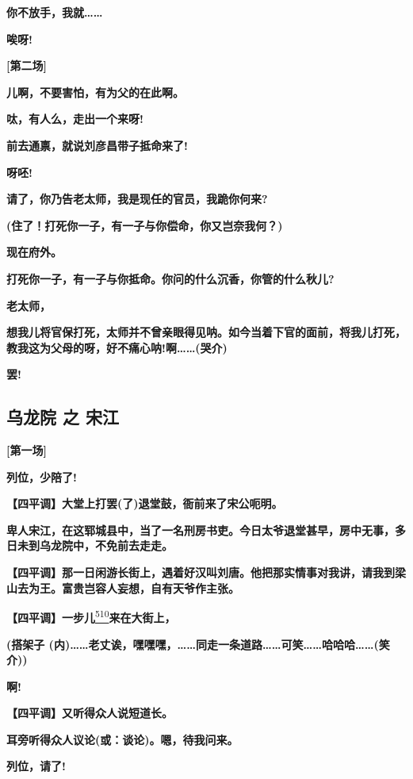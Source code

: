 \textbf{你不放手，我就\ldots{}\ldots{}}

\textbf{唉呀!}

\textbf{{[}第二场{]}}

\textbf{儿啊，不要害怕，有为父的在此啊。}

\textbf{呔，有人么，走出一个来呀!}

\textbf{前去通禀，就说刘彦昌带子抵命来了!}

\textbf{呀呸!}

\textbf{请了，你乃告老太师，我是现任的官员，我跪你何来?}

\textbf{(住了！打死你一子，有一子与你偿命，你又岂奈我何？)}

\textbf{现在府外。}

\textbf{打死你一子，有一子与你抵命。你问的什么沉香，你管的什么秋儿?}

\textbf{老太师，}

\textbf{想我儿将官保打死，太师并不曾亲眼得见呐。如今当着下官的面前，将我儿打死，教我这为父母的呀，好不痛心呐!啊\ldots{}\ldots{}(哭介)}

\textbf{罢!}

\newpage
\hypertarget{ux4e4cux9f99ux9662-ux4e4b-ux5b8bux6c5f}{%
\subsection{乌龙院 之
宋江}\label{ux4e4cux9f99ux9662-ux4e4b-ux5b8bux6c5f}}

\textbf{{[}第一场{]}}

\textbf{列位，少陪了!}

\textbf{【四平调】大堂上打罢(了)退堂鼓，衙前来了宋公呃明。}

\textbf{卑人宋江，在这郓城县中，当了一名刑房书吏。今日太爷退堂甚早，房中无事，多日未到乌龙院中，不免前去走走。}

\textbf{【四平调】那一日闲游长街上，遇着好汉叫刘唐。他把那实情事对我讲，请我到梁山去为王。富贵岂容人妄想，自有天爷作主张。}

\textbf{【四平调】一步儿}\protect\hyperlink{fn510}{\textsuperscript{510}}\textbf{来在大街上，}

\textbf{(搭架子
(内)\ldots{}\ldots{}老丈诶，嘿嘿嘿，\ldots{}\ldots{}同走一条道路\ldots{}\ldots{}可笑\ldots{}\ldots{}哈哈哈\ldots{}\ldots{}(笑介))}

\textbf{啊!}

\textbf{【四平调】又听得众人说短道长。}

\textbf{耳旁听得众人议论(或：谈论)。嗯，待我问来。}

\textbf{列位，请了!}

